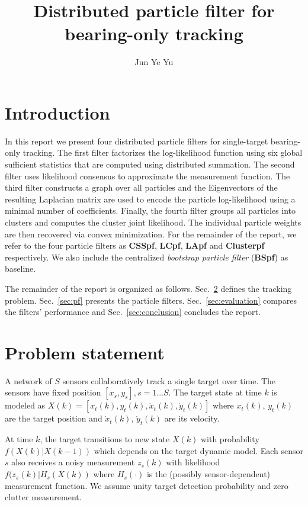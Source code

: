 \documentclass[10pt,letterpaper,final]{article}
\author{Jun Ye Yu}
\title{Distributed particle filter for bearing-only tracking}
\begin{document}
\maketitle

\section{Introduction}
In this report we present four distributed particle filters for single-target bearing-only tracking. The first filter factorizes the log-likelihood function using six global sufficient statistics that are computed using distributed summation. The second filter uses likelihood consensus to approximate the measurement function. The third filter constructs a graph over all particles and the Eigenvectors of the resulting Laplacian matrix are used to encode the particle log-likelihood using a minimal number of coefficients. Finally, the fourth filter groups all particles into clusters and computes the cluster joint likelihood. The individual particle weights are then recovered via convex minimization. For the remainder of the report, we refer to the four particle filters as \textbf{CSSpf}, \textbf{LCpf}, \textbf{LApf} and \textbf{Clusterpf} respectively. We also include the centralized \textit{bootstrap particle filter} (\textbf{BSpf}) as baseline. 

The remainder of the report is organized as follows. Sec.~\ref{sec:problem} defines the tracking problem. Sec.~\ref{sec:pf} presents the particle filters. Sec.~\ref{sec:evaluation} compares the filters' performance and Sec.~\ref{sec:conclusion} concludes the report. 

\section{Problem statement}
\label{sec:problem}
A network of $S$ sensors collaboratively track a single target over time. The sensors have fixed position $[x_s, y_s], s=1...S$. The target state at time $k$ is modeled as $X(k) = [x_t(k),y_t(k), \dot{x}_t(k), \dot{y}_t(k)]$ where $x_t(k)$, $y_t(k)$ are the target position and $\dot{x}_t(k)$, $\dot{y}_t(k)$ are its velocity. 

At time $k$, the target transitions to new state $X(k)$ with probability $f(X(k)|X(k-1))$ which depends on the target dynamic model. Each sensor $s$ also receives a noisy measurement $z_s(k)$ with likelihood $f(z_s(k)|H_s(X(k))$ where $H_s(\cdot)$ is the (possibly sensor-dependent) measurement function. We assume unity target detection probability and zero clutter measurement. 
\end{document}
